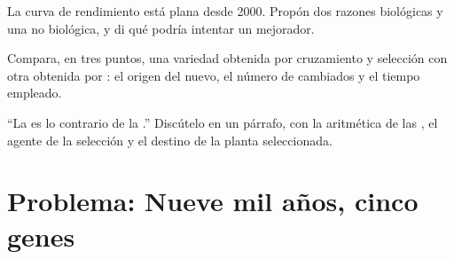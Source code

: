 \begin{exercise}[$\star\star\star$]\label{exo:g12:domesticated-plants:13}
La curva de rendimiento está plana desde 2000. Propón dos razones
biológicas y una no biológica, y di qué podría intentar un mejorador.
\end{exercise}

\begin{exercise}[$\star\star\star$]\label{exo:g12:domesticated-plants:14}
Compara, en tres puntos, una variedad obtenida por cruzamiento y
selección con otra obtenida por : el origen del 
nuevo, el número de  cambiados y el tiempo empleado.
\end{exercise}

\begin{exercise}[$\star\star\star$]\label{exo:g12:domesticated-plants:15}
``La  es lo contrario de la .'' Discútelo
en un párrafo, con la aritmética de las , el agente
de la selección y el destino de la planta seleccionada.
\end{exercise}

\section{Problema: Nueve mil años, cinco genes}

